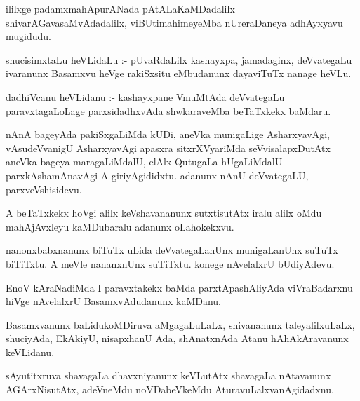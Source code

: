 \documentclass{article}
\begin{document}
\begin{mn}
ililxge  padamxmahApurANada  pAtALaKaMDadalilx  shivarAGavasaMvAdadalilx,  viBUtimahimeyeMba  nUreraDaneya  adhAyxyavu  mugidudu.
\end{mn}




\begin{mn}
shucisimxtaLu  heVLidaLu :- pUvaRdaLilx  kashayxpa,  jamadaginx,  deVvategaLu  ivaranunx  Basamxvu  heVge  
rakiSxsitu  eMbudanunx  dayaviTuTx  nanage  heVLu.
\end{mn}

\begin{mn}
dadhiVcanu  heVLidanu :- kashayxpane  VmuMtAda  deVvategaLu  paravxtagaLoLage  parxsidadhxvAda  
shwkaraveMba  beTaTxkekx  baMdaru.
\end{mn}

\begin{mn}
nAnA  bageyAda  pakiSxgaLiMda  kUDi,  aneVka  munigaLige  AsharxyavAgi,  vAsudeVvanigU  AsharxyavAgi  
apasxra sitxrXVyariMda  seVvisalapxDutAtx  aneVka  bageya  maragaLiMdalU,  elAlx  QutugaLa  hUgaLiMdalU  
parxkAshamAnavAgi  A  giriyAgididxtu.  adanunx  nAnU  deVvategaLU,  parxveVshisidevu.
\end{mn}

\begin{mn}
A  beTaTxkekx  hoVgi  alilx  keVshavananunx  sutxtisutAtx  iralu  alilx  oMdu  mahAjAvxleyu  kaMDubaralu  
adanunx  oLahokekxvu.
\end{mn}

\begin{mn}
nanonxbabxnanunx  biTuTx  uLida  deVvategaLanUnx  munigaLanUnx  suTuTx  biTiTxtu.  A meVle  nananxnUnx  
suTiTxtu.  konege  nAvelalxrU  bUdiyAdevu.
\end{mn}

\begin{mn}
EnoV  kAraNadiMda  I paravxtakekx  baMda  parxtApashAliyAda  viVraBadarxnu  hiVge  nAvelalxrU  BasamxvAdudanunx  kaMDanu.
\end{mn}

\begin{mn}
Basamxvanunx  baLidukoMDiruva  aMgagaLuLaLx,  shivananunx  taleyalilxuLaLx, shuciyAda,  EkAkiyU,  nisapxhanU  
Ada,  shAnatxnAda  Atanu  hAhAkAravanunx  keVLidanu.
\end{mn}

\begin{mn}
sAyutitxruva  shavagaLa  dhavxniyanunx  keVLutAtx  shavagaLa  nAtavanunx  AGArxNisutAtx,  adeVneMdu  
noVDabeVkeMdu  AturavuLalxvanAgidadxnu.
\end{mn}
\end{document}
